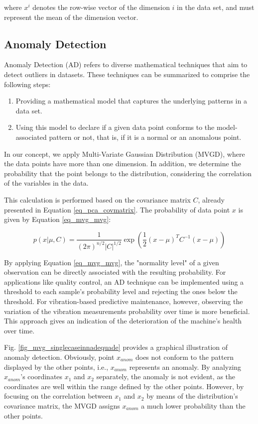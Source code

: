 \documentclass[conference]{IEEEtran}
\begin{document}
where $x^{i}$ denotes the row-wise vector of the dimension $i$ in the data set, and must represent the mean of the dimension vector. 

\subsection{Anomaly Detection}
\label{sec_anomaly_detection}
Anomaly Detection (AD) refers to diverse mathematical techniques that aim to detect outliers in datasets. These techniques can be summarized to comprise the following steps: 

\begin{enumerate}
	\item Providing a mathematical model that captures the underlying patterns in a data set.
	\item Using this model to declare if a given data point conforms to the model-associated pattern or not, that is, if it is a normal or an anomalous point.
\end{enumerate}

In our concept, we apply Multi-Variate Gaussian Distribution (MVGD), where the data points have more than one dimension. In addition, we determine the probability that the point belongs to the distribution, considering the correlation of the variables in the data.

This calculation is performed based on the covariance matrix $C$, already presented in Equation \ref{eq_pca_covmatrix}. The probability of data point $x$ is given by Equation \ref{eq_mvg_mvg}:

\begin{equation}
	\label{eq_mvg_mvg}
	p(x|\mu,C)=\frac{1}{(2\pi)^{n/2}|C|^{1/2}}\exp{\left(\frac{1}{2}(x-\mu)^{T}C^{-1}(x-\mu)\right) }
\end{equation}

By applying Equation \ref{eq_mvg_mvg}, the "normality level" of a given observation can be directly associated with the resulting probability. For applications like quality control, an AD technique can be implemented using a threshold to each sample's probability level and rejecting the ones below the threshold. For vibration-based predictive maintenance, however, observing the variation of the vibration measurements probability over time is more beneficial. This approach gives an indication of the deterioration of the machine's health over time.

Fig. \ref{fig_mvg_singlecaseinnadequade} provides a graphical illustration of anomaly detection. Obviously, point $x_{anom}$ does not conform to the pattern displayed by the other points, i.e., $x_{anom}$ represents an anomaly. By analyzing $x_{anom}$'s coordinates $x_{1}$ and $x_{2}$ separately, the anomaly is not evident, as the coordinates are well within the range defined by the other points. However, by focusing on the correlation between $x_{1}$ and $x_{2}$ by means of the distribution's covariance matrix, the MVGD assigns $x_{anom}$ a much lower probability than the other points.
\end{document}
